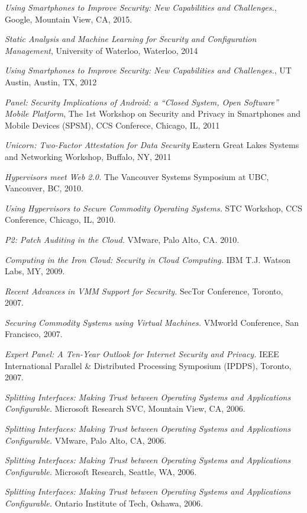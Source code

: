 \documentclass[10pt]{article}
\newenvironment{lonelist}[1][\enskip\textbullet]%
        {\vspace{-\baselineskip}\begin{list}{#1}{%
        \setlength{\partopsep}{0pt}%
        \setlength{\topsep}{0pt}
	\setlength{\leftmargin}{0pt}}}
        {\end{list}\vspace{-.6\baselineskip}}
\newenvironment{innerenum}[1][1.]%
        {\begin{compactenum}[#1]}{\end{compactenum}}
\begin{document}
\begin{lonelist}
\begin{innerenum}
\item {\em Using Smartphones to Improve Security: New Capabilities and Challenges.}, Google, Mountain View, CA, 2015.
\item {\em Static Analysis and Machine Learning for Security and Configuration Management}, University of Waterloo, Waterloo, 2014
\item {\em Using Smartphones to Improve Security: New Capabilities and Challenges.}, UT Austin, Austin, TX, 2012
\item {\em Panel: Security Implications of Android: a ``Closed System, Open Software'' Mobile Platform}, The 1st Workshop on Security and Privacy in Smartphones and Mobile Devices ({SPSM}), CCS Conferece, Chicago, IL, 2011
\item {\em Unicorn: Two-Factor Attestation for Data Security} Eastern Great Lakes Systems and Networking Workshop, Buffalo, NY, 2011
\item {\em Hypervisors meet Web 2.0.} The Vancouver Systems Symposium at UBC, Vancouver, BC, 2010.
\item {\em Using Hypervisors to Secure Commodity Operating Systems.} STC Workshop, CCS Conference, Chicago, IL, 2010.
\item {\em P2: Patch Auditing in the Cloud.} VMware, Palo Alto, CA. 2010.
\item {\em Computing in the Iron Cloud: Security in Cloud Computing.}	IBM T.J. Watson Labs, MY, 2009.
\item {\em Recent Advances in VMM Support for Security.} SecTor Conference, Toronto, 2007.
\item {\em Securing Commodity Systems using Virtual Machines.} VMworld Conference, San Francisco, 2007.
\item {\em Expert Panel: A Ten-Year Outlook for Internet Security and Privacy.} IEEE International Parallel \& Distributed Processing Symposium (IPDPS), Toronto, 2007.
\item {\em Splitting Interfaces: Making Trust between Operating Systems and Applications Configurable.} Microsoft Research SVC, Mountain View, CA, 2006.
\item {\em Splitting Interfaces: Making Trust between Operating Systems and Applications Configurable.} VMware, Palo Alto, CA, 2006.
\item {\em Splitting Interfaces: Making Trust between Operating Systems and Applications Configurable.} Microsoft Research, Seattle, WA, 2006.
\item {\em Splitting Interfaces: Making Trust between Operating Systems and Applications Configurable.} Ontario Institute of Tech, Oshawa, 2006.

\end{innerenum}
\end{lonelist}
\end{document}
